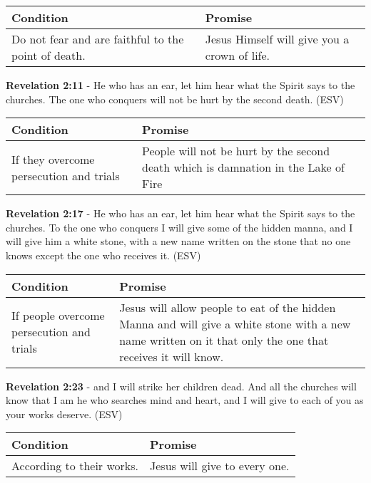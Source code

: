 \documentclass[11pt]{article}
\begin{document}
\begin{center}
\begin{tabular}{ll}
Condition & Promise\\[0pt]
\hline
Do not fear and are faithful to the point of death. & Jesus Himself will give you a crown of life.\\[0pt]
\end{tabular}
\end{center}

\textbf{Revelation 2:11} -  He who has an ear, let him hear what the Spirit says to the churches.  The one who conquers will not be hurt by the second death.  (ESV)

\begin{center}
\begin{tabular}{ll}
Condition & Promise\\[0pt]
\hline
If they overcome persecution and trials & People will not be hurt by the second death which is damnation in the Lake of Fire\\[0pt]
\end{tabular}
\end{center}

\textbf{Revelation 2:17} -  He who has an ear, let him hear what the Spirit says to the churches.  To the one who conquers I will give some of the hidden manna, and I will give him a white stone, with a new name written on the stone that no one knows except the one who receives it.  (ESV)

\begin{center}
\begin{tabular}{ll}
Condition & Promise\\[0pt]
\hline
If people overcome persecution and trials & Jesus will allow people to eat of the hidden Manna and will give a white stone with a new name written on it that only the one that receives it will know.\\[0pt]
\end{tabular}
\end{center}

\textbf{Revelation 2:23} -  and I will strike her children dead.  And all the churches will know that I am he who searches mind and heart, and I will give to each of you as your works deserve.  (ESV)

\begin{center}
\begin{tabular}{ll}
Condition & Promise\\[0pt]
\hline
According to their works. & Jesus will give to every one.\\[0pt]
\end{tabular}
\end{center}
\end{document}
